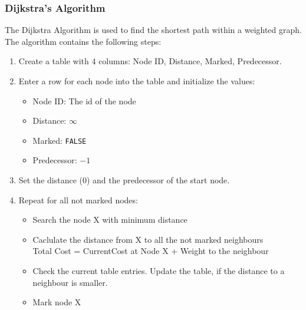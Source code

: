 \begin{frame}[fragile]
\frametitle{Dijkstra's Algorithm}
The Dijkstra Algorithm is used to find the shortest path within a weighted graph.\\
The algorithm contains the following steps:

{\tiny
\begin{enumerate}
\item Create a table with 4 columns: Node ID, Distance, Marked, Predecessor.
\item Enter a row for each node into the table and initialize the values:
\begin{itemize}
\item Node ID: The id of the node
\item Distance: $\infty$
\item Marked: \verb|FALSE|
\item Predecessor: $-1$
\end{itemize}
\item Set the distance (0) and the predecessor of the start node.
\item Repeat for all not marked nodes:
\begin{itemize}
\item Search the node X with minimum distance
\item Caclulate the distance from X to all the not marked neighbours\\
Total Cost = CurrentCost at Node X + Weight to the neighbour
\item Check the current table entries. Update the table, if
the distance to a neighbour is smaller.
\item Mark node X
\end{itemize}
\end{enumerate}
}

\end{frame}

